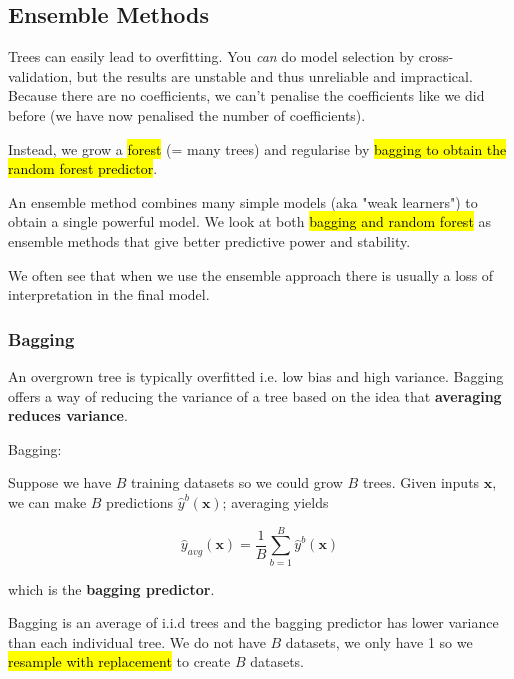 \documentclass[11pt]{article}
\begin{document}
\subsection{Ensemble Methods}


Trees can easily lead to overfitting. You \textit{can} do model selection by cross-validation, but the results are unstable and thus unreliable and impractical. Because there are no coefficients, we can't penalise the coefficients like we did before (we have now penalised the number of coefficients). 

Instead, we grow a \hl{forest} (= many trees) and regularise by \hl{bagging to obtain the random forest predictor}.



An ensemble method combines many simple models (aka "weak learners") to obtain a single powerful model. We look at both \hl{bagging and random forest} as ensemble methods that give better predictive power and stability.

\begin{note}
    We often see that when we use the ensemble approach there is usually a loss of interpretation in the final model.
\end{note}

\subsubsection{Bagging}

An overgrown tree is typically overfitted i.e. low bias and high variance. Bagging offers a way of reducing the variance of a tree based on the idea that \textbf{averaging reduces variance}.

\begin{definition}
    Bagging:

    Suppose we have $B$ training datasets so we could grow $B$ trees. Given inputs $\mathbf{x}$, we can make $B$ predictions $\hat{y}^b(\mathbf{x})$; averaging yields

    \begin{equation*}
        \hat{y}_{avg}(\mathbf{x}) = \dfrac{1}{B}\sum_{b=1}^B \hat{y}^b(\mathbf{x})
    \end{equation*}

    which is the \textbf{bagging predictor}. 
\end{definition}

Bagging is an average of i.i.d trees and the bagging predictor has lower variance than each individual tree. We do not have $B$ datasets, we only have 1 so we \hl{resample with replacement} to create $B$ datasets.
\end{document}
